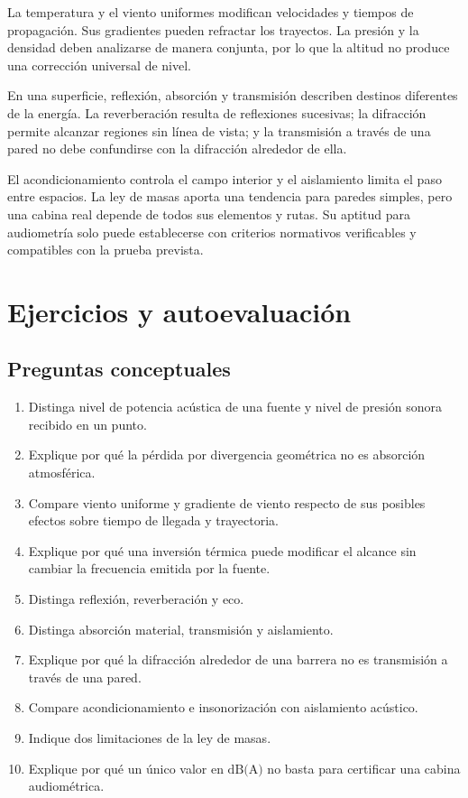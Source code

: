 La temperatura y el viento uniformes modifican velocidades y tiempos de
propagación. Sus gradientes pueden refractar los trayectos. La presión y la
densidad deben analizarse de manera conjunta, por lo que la altitud no produce
una corrección universal de nivel.

En una superficie, reflexión, absorción y transmisión describen destinos
diferentes de la energía. La reverberación resulta de reflexiones sucesivas;
la difracción permite alcanzar regiones sin línea de vista; y la transmisión
a través de una pared no debe confundirse con la difracción alrededor de ella.

El acondicionamiento controla el campo interior y el aislamiento limita el
paso entre espacios. La ley de masas aporta una tendencia para paredes simples,
pero una cabina real depende de todos sus elementos y rutas. Su aptitud para
audiometría solo puede establecerse con criterios normativos verificables y
compatibles con la prueba prevista.

\section{Ejercicios y autoevaluación}
\label{sec:u9-ejercicios}

\subsection*{Preguntas conceptuales}

\begin{enumerate}[label=\textbf{C\arabic*.},leftmargin=*]
    \item Distinga nivel de potencia acústica de una fuente y nivel de presión
    sonora recibido en un punto.
    \item Explique por qué la pérdida por divergencia geométrica no es
    absorción atmosférica.
    \item Compare viento uniforme y gradiente de viento respecto de sus
    posibles efectos sobre tiempo de llegada y trayectoria.
    \item Explique por qué una inversión térmica puede modificar el alcance sin
    cambiar la frecuencia emitida por la fuente.
    \item Distinga reflexión, reverberación y eco.
    \item Distinga absorción material, transmisión y aislamiento.
    \item Explique por qué la difracción alrededor de una barrera no es
    transmisión a través de una pared.
    \item Compare acondicionamiento e insonorización con aislamiento acústico.
    \item Indique dos limitaciones de la ley de masas.
    \item Explique por qué un único valor en \(\text{dB(A)}\) no basta para
    certificar una cabina audiométrica.
\end{enumerate}

